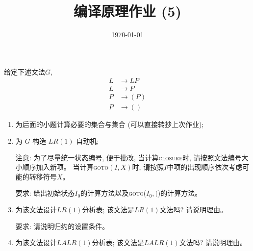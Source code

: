 \documentclass[a4paper, justified]{tufte-handout}
\title{编译原理作业 (5)}
\date{\today}
\begin{document}
\maketitle
\noplagiarism %
\begin{abstract}
\end{abstract}
\beginrequired

\begin{problem}[\score{10 = 1 + 4 + 2 + 3}]
  给定下述文法$G$,
  \begin{align}
    L &\to LP \\[8pt]
    L &\to P \\[8pt]
    P &\to (P) \\[8pt]
    P &\to ()
  \end{align}

  \begin{enumerate}[(1)]
    \item 为后面的小题计算必要的\first{}集合与\follow{}集合 (可以直接转抄上次作业);
    \item 为 $G$ 构造 $LR(1)$ 自动机;

      注意: 为了尽量统一状态编号, 便于批改, 当计算\textsc{closure}时, 请按照文法编号大小顺序加入新项。
      当计算\textsc{goto}$(I, X)$时, 请按照$I$中项的出现顺序依次考虑可能的转移符号$X$。
      
      要求: 给出初始状态$I_{0}$的计算方法以及\textsc{goto}($I_{0}, ($)的计算方法。
    \item 为该文法设计$LR(1)$分析表; 该文法是$LR(1)$文法吗? 请说明理由。

      要求: 请说明归约的设置条件。
    \item 为该文法设计$LALR(1)$分析表; 该文法是$LALR(1)$文法吗? 请说明理由。
  \end{enumerate}
\end{problem}
\end{document}
